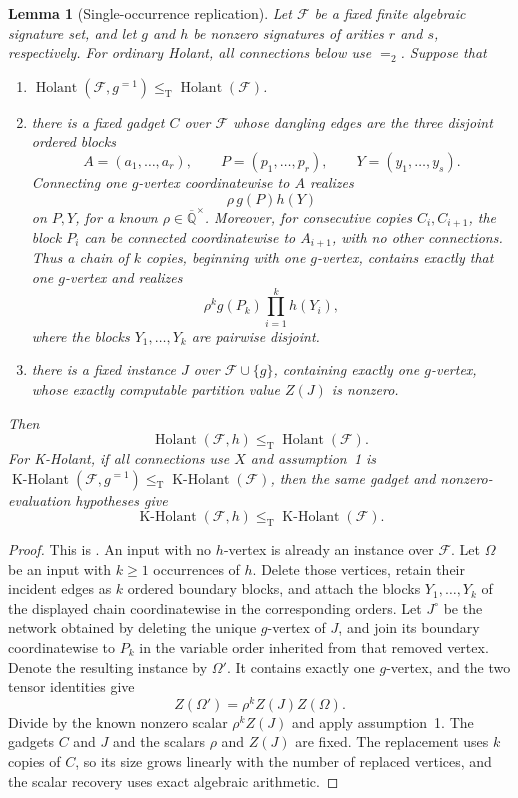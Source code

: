 \documentclass[11pt,letterpaper,onecolumn]{article}
\theoremstyle{plain}
\newtheorem{lemma}[lemma]{Lemma}
\theoremstyle{definition}
\theoremstyle{remark}
\newcommand{\AlgNums}{\overline{\mathbb Q}}
\newcommand{\cF}{\mathcal F}
\newcommand{\Holant}{\operatorname{Holant}}
\newcommand{\KHolant}{\operatorname{K\text{-}Holant}}
\newcommand{\Eq}{=}
\newcommand{\leT}{\leq_{\mathrm T}}
\begin{document}
	\begin{lemma}[Single-occurrence replication]
		\label{lem:single-occurrence-replication}
		Let \(\cF\) be a fixed finite algebraic signature set, and let \(g\) and
		\(h\) be nonzero signatures of arities \(r\) and \(s\), respectively.  For ordinary Holant,
		all connections below use \(\Eq_2\).  Suppose that
		\begin{enumerate}
			\item \(\Holant(\cF,g^{=1})\leT\Holant(\cF)\).
			\item there is a fixed gadget \(C\) over \(\cF\) whose dangling edges are
			the three disjoint ordered blocks
			\[
			A=(a_1,\ldots,a_r),\qquad
			P=(p_1,\ldots,p_r),\qquad
			Y=(y_1,\ldots,y_s).
			\]
			Connecting one \(g\)-vertex coordinatewise to \(A\) realizes
			\[
			\rho\,g(P)h(Y)
			\]
			on \(P,Y\), for a known \(\rho\in\AlgNums^\times\).  Moreover, for
			consecutive copies \(C_i,C_{i+1}\), the block \(P_i\) can be connected
			coordinatewise to \(A_{i+1}\), with no other connections.
			Thus a chain of \(k\) copies, beginning with one \(g\)-vertex,
			contains exactly that one \(g\)-vertex and realizes
			\[
			\rho^k g(P_k)\prod_{i=1}^k h(Y_i),
			\]
			where the blocks \(Y_1,\ldots,Y_k\) are pairwise disjoint.
			\item there is a fixed instance \(J\) over \(\cF\cup\{g\}\), containing
			exactly one \(g\)-vertex, whose exactly computable partition value
			\(Z(J)\) is nonzero.
		\end{enumerate}
		Then
		\[
		\Holant(\cF,h)\leT\Holant(\cF).
		\]
		For K-Holant, if all connections use \(X\) and assumption~1 is
		\(\KHolant(\cF,g^{=1})\leT\KHolant(\cF)\), then the same
		gadget and nonzero-evaluation hypotheses give
		\[
		\KHolant(\cF,h)\leT\KHolant(\cF).
		\]
	\end{lemma}
	
	\begin{proof}
		This is \cite[Lemma~3.3]{Liu2026DEQ2Holant}.  An input with no \(h\)-vertex
		is already an instance over \(\cF\).  Let \(\Omega\) be an input with
		\(k\ge1\) occurrences of \(h\).  Delete those vertices, retain their incident
		edges as \(k\) ordered boundary blocks, and attach the blocks
		\(Y_1,\ldots,Y_k\) of the displayed chain coordinatewise in the corresponding
		orders.  Let \(J^\circ\) be the network obtained by deleting the
		unique \(g\)-vertex of \(J\), and join its boundary coordinatewise to
		\(P_k\) in the variable order inherited from that removed vertex.  Denote the
		resulting instance by \(\Omega'\).  It contains exactly one
		\(g\)-vertex, and the two tensor identities give
		\[
		Z(\Omega')=\rho^k Z(J)Z(\Omega).
		\]
		Divide by the known nonzero scalar \(\rho^kZ(J)\) and apply assumption~1.
The gadgets \(C\) and \(J\) and the scalars \(\rho\) and \(Z(J)\)
are fixed.  The replacement uses \(k\) copies of \(C\), so its size
grows linearly with the number of replaced vertices, and the scalar
recovery uses exact algebraic arithmetic.
	\end{proof}
	
\end{document}
